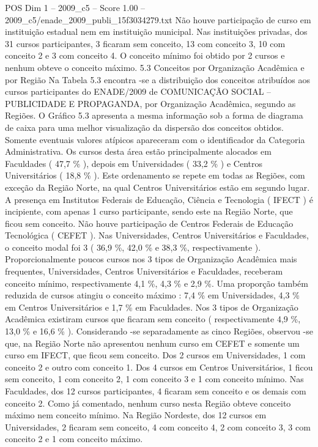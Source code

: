 \begin{textsample}{POS Dim 1 – 2009\_c5 – Score 1.00 – 2009\_c5/enade\_2009\_publi\_15f3034279.txt}
Não houve participação de curso em instituição estadual nem em instituição municipal.
Nas instituições privadas, dos 31 cursos participantes, 3 ficaram sem conceito, 13 com conceito 3, 10 com conceito 2 e 3 com conceito 4.
O conceito mínimo foi obtido por 2 cursos e nenhum obteve o conceito máximo. 5.3 Conceitos por Organização Acadêmica e por Região Na Tabela 5.3 encontra -se a distribuição dos conceitos atribuídos aos cursos participantes do ENADE/2009 de COMUNICAÇÃO SOCIAL – PUBLICIDADE E PROPAGANDA, por Organização Acadêmica, segundo as Regiões.
O Gráfico 5.3 apresenta a mesma informação sob a forma de diagrama de caixa para uma melhor visualização da dispersão dos conceitos obtidos.
Somente eventuais valores atípicos apareceram com o identificador da Categoria Administrativa.
Os cursos desta área estão principalmente alocados em Faculdades ( 47,7 \% ), depois em Universidades ( 33,2 \% ) e Centros Universitários ( 18,8 \% ).
Este ordenamento se repete em todas as Regiões, com exceção da Região Norte, na qual Centros Universitários estão em segundo lugar.
A presença em Institutos Federais de Educação, Ciência e Tecnologia ( IFECT ) é incipiente, com apenas 1 curso participante, sendo este na Região Norte, que ficou sem conceito.
Não houve participação de Centros Federais de Educação Tecnológica ( CEFET ).
Nas Universidades, Centros Universitários e Faculdades, o conceito modal foi 3 ( 36,9 \%, 42,0 \% e 38,3 \%, respectivamente ).
Proporcionalmente poucos cursos nos 3 tipos de Organização Acadêmica mais frequentes, Universidades, Centros Universitários e Faculdades, receberam conceito mínimo, respectivamente 4,1 \%, 4,3 \% e 2,9 \%.
Uma proporção também reduzida de cursos atingiu o conceito máximo : 7,4 \% em Universidades, 4,3 \% em Centros Universitários e 1,7 \% em Faculdades.
Nos 3 tipos de Organização Acadêmica existiram cursos que ficaram sem conceito ( respectivamente 4,9 \%, 13,0 \% e 16,6 \% ).
Considerando -se separadamente as cinco Regiões, observou -se que, na Região Norte não apresentou nenhum curso em CEFET e somente um curso em IFECT, que ficou sem conceito.
Dos 2 cursos em Universidades, 1 com conceito 2 e outro com conceito 1.
Dos 4 cursos em Centros Universitários, 1 ficou sem conceito, 1 com conceito 2, 1 com conceito 3 e 1 com conceito mínimo.
Nas Faculdades, dos 12 cursos participantes, 4 ficaram sem conceito e os demais com conceito 2.
Como já comentado, nenhum curso nesta Região obteve conceito máximo nem conceito mínimo.
Na Região Nordeste, dos 12 cursos em Universidades, 2 ficaram sem conceito, 4 com conceito 4, 2 com conceito 3, 3 com conceito 2 e 1 com conceito máximo.

\end{textsample}
